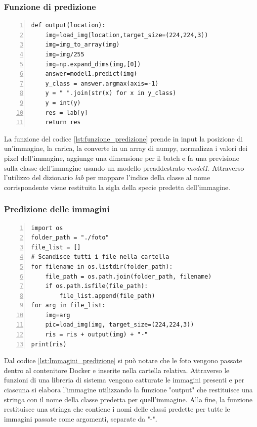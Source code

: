 \documentclass[a4paper,final,12pt]{report}
\begin{document}
\subsubsection{Funzione di predizione}
\begin{lstlisting}[caption={Codice della funzione di predizione.}, label={lst:funzione_predizione}, breaklines, escapechar=`\%, frame=lines, basicstyle=\small\ttfamily, keepspaces=true, numbers=left]
def output(location):
    img=load_img(location,target_size=(224,224,3))
    img=img_to_array(img)
    img=img/255
    img=np.expand_dims(img,[0])
    answer=model1.predict(img)
    y_class = answer.argmax(axis=-1)
    y = " ".join(str(x) for x in y_class)
    y = int(y)
    res = lab[y]
    return res
\end{lstlisting}
La funzione del codice \ref{lst:funzione_predizione} prende in input la posizione di un'immagine, la carica, la converte in un array di numpy, normalizza i valori dei pixel dell'immagine, aggiunge una dimensione per il batch e fa una previsione sulla classe dell'immagine usando un modello preaddestrato \textit{model1}. Attraverso l'utilizzo del dizionario \textit{lab} per mappare l'indice della classe al nome corrispondente viene restituita la sigla della specie predetta dell'immagine.

\subsubsection{Predizione delle immagini}
\begin{lstlisting}[caption={Codice della predizione delle immagini.}, label={lst:Immagini_predizione}, breaklines, escapechar=`\%, frame=lines, basicstyle=\small\ttfamily, keepspaces=true, numbers=left]
import os
folder_path = "./foto"
file_list = []
# Scandisce tutti i file nella cartella
for filename in os.listdir(folder_path):
    file_path = os.path.join(folder_path, filename)
    if os.path.isfile(file_path):
        file_list.append(file_path)
for arg in file_list:
    img=arg
    pic=load_img(img, target_size=(224,224,3))
    ris = ris + output(img) + "-"
print(ris)
\end{lstlisting}
Dal codice \ref{lst:Immagini_predizione} si può notare che le foto vengono passate dentro al contenitore Docker e inserite nella cartella relativa. Attraverso le funzioni di una libreria di sistema vengono catturate le immagini presenti e per ciascuna si elabora l'immagine utilizzando la funzione "output" che restituisce una stringa con il nome della classe predetta per quell'immagine. Alla fine, la funzione restituisce una stringa che contiene i nomi delle classi predette per tutte le immagini passate come argomenti, separate da "-".
\end{document}
